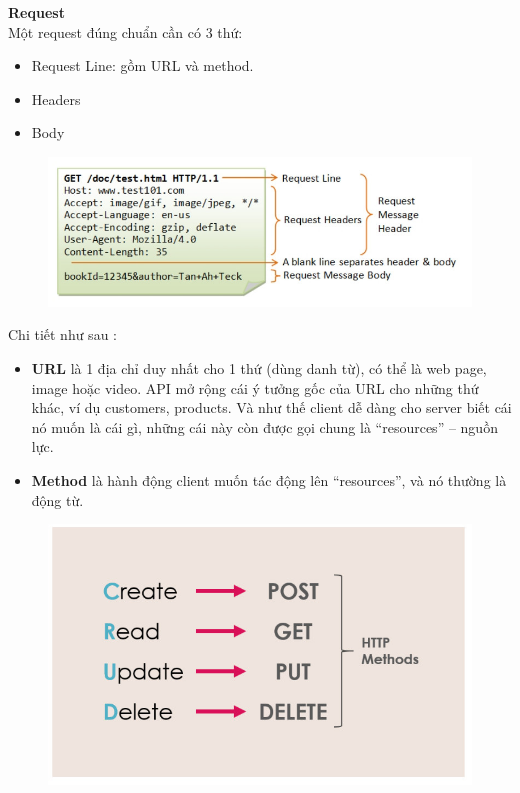 \documentclass[a4paper]{article}
\begin{document}
\textbf{Request}\\
Một request đúng chuẩn cần có 3 thứ:
\begin{itemize}
    \item Request Line: gồm URL và method.
    \item Headers
    \item Body
\end{itemize}
\begin{figure}[h!]
\begin{center}
\includegraphics[width=14cm]{picture/anh 2.jpg}
\end{center}
\end{figure}
Chi tiết như sau :
\begin{itemize}
    \item \textbf{URL} là 1 địa chỉ duy nhất cho 1 thứ (dùng danh từ), có thể là web page, image hoặc video. API mở rộng cái ý tưởng gốc của URL cho những thứ khác, ví dụ customers, products. Và như thế client dễ dàng cho server biết cái nó muốn là cái gì, những cái này còn được gọi chung là “resources” – nguồn lực.
    \item \textbf{Method} là hành động client muốn tác động lên “resources”, và nó thường là động từ. 
\end{itemize}
\begin{figure}[h!]
\begin{center}
\includegraphics[width=14cm]{picture/anh 3.jpg}
\end{center}
\end{figure}
\end{document}
